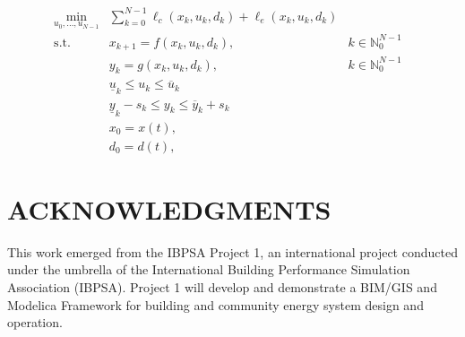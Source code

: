 \documentclass[10pt]{extarticle}
\begin{document}
\begin{subequations}
	\label{eq:mpc_building_formal}
	\begin{align}
	\min_{u_0, \ldots, u_{N-1}}  
	&\sum_{k=0}^{N-1} \ell_c(x_k,u_k,d_k) + \ell_e(x_k,u_k,d_k) &
	\label{eq:mpc_building_formal:cost}\\
	\text{s.t.} \ & x_{k+1} = f(x_k, u_k, d_k),  & k \in \mathbb{N}_{0}^{N-1} & \label{eq:mpc_general_formal:xp} \\
	& y_{k} = g(x_k, u_k, d_k),  & k \in \mathbb{N}_{0}^{N-1} & \label{eq:mpc_general_formal:yp} \\
	& \underline{u}_k   \le u_{k} \le  \overline{u}_k    \label{eq:mpc_building_formal:ub}\\
	& \underline{y}_k  -s_k \le y_{k} \le  \overline{y}_k + s_k  
	\label{eq:mpc_building_formal:yb}\\
	& x_0 = x(t),\label{eq:mpc_general_formal:x0} \\
	& d_0 = d(t),\label{eq:mpc_general_formal:d0}
	\end{align}
\end{subequations}








\vspace{24pt}


\section*{ACKNOWLEDGMENTS}

This work emerged from the IBPSA Project 1, an international project conducted under the umbrella of the International Building Performance Simulation Association (IBPSA). Project 1 will develop and demonstrate a BIM/GIS and Modelica Framework for building and community energy system design and operation.
\end{document}
